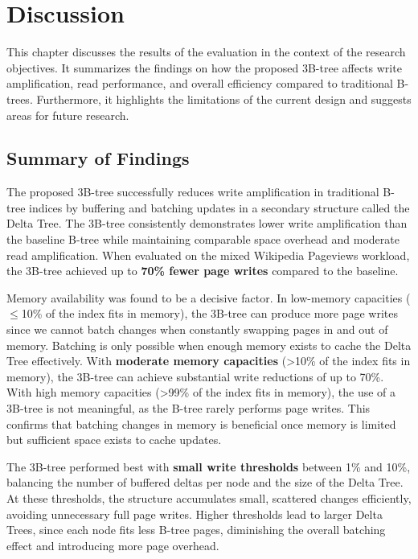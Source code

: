 
\chapter{Discussion}

This chapter discusses the results of the evaluation in the context of the research objectives.
It summarizes the findings on how the proposed 3B-tree affects write amplification, read performance, and overall efficiency compared to traditional B-trees.
Furthermore, it highlights the limitations of the current design and suggests areas for future research.

\section{Summary of Findings}
The proposed 3B-tree successfully reduces write amplification in traditional B-tree indices by buffering and batching updates in a secondary structure called the Delta Tree. 
The 3B-tree consistently demonstrates lower write amplification than the baseline B-tree while maintaining comparable space overhead and moderate read amplification.
When evaluated on the mixed Wikipedia Pageviews workload, the 3B-tree achieved up to \textbf{70\% fewer page writes} compared to the baseline.

Memory availability was found to be a decisive factor. 
In low-memory capacities ($\leq$10\% of the index fits in memory), the 3B-tree can produce more page writes since we cannot batch changes when constantly swapping pages in and out of memory.
Batching is only possible when enough memory exists to cache the Delta Tree effectively. 
With \textbf{moderate memory capacities} (>10\% of the index fits in memory), the 3B-tree can achieve substantial write reductions of up to 70\%.
With high memory capacities (>99\% of the index fits in memory), the use of a 3B-tree is not meaningful, as the B-tree rarely performs page writes.
This confirms that batching changes in memory is beneficial once memory is limited but sufficient space exists to cache updates.

The 3B-tree performed best with \textbf{small write thresholds} between 1\% and 10\%, balancing the number of buffered deltas per node and the size of the Delta Tree. 
At these thresholds, the structure accumulates small, scattered changes efficiently, avoiding unnecessary full page writes. 
Higher thresholds lead to larger Delta Trees, since each node fits less B-tree pages, diminishing the overall batching effect and introducing more page overhead.

